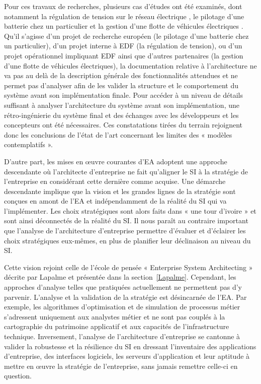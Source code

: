 	Pour ces travaux de recherches, plusieurs cas d'études ont été examinés, dont notamment la régulation de tension sur le réseau électrique \cite{seghiri2014simulation}, le pilotage d'une batterie chez un particulier \cite{seghiri2012animation} et la gestion d'une flotte de véhicules électriques \cite{seghiri2015simulation}. Qu'il s'agisse d'un projet de recherche européen (le pilotage d'une batterie chez un particulier), d'un projet interne à EDF (la régulation de tension), ou d'un projet opérationnel impliquant EDF ainsi que d'autres partenaires (la gestion d'une flotte de véhicules électriques), la documentation relative à l'architecture ne va pas au delà de la description générale des fonctionnalités attendues et ne permet pas d'analyser afin de les valider la structure et le comportement du système avant son implémentation finale. Pour accéder à un niveau de détails suffisant à analyser l'architecture du système avant son implémentation, une rétro-ingénierie du système final et des échanges avec les développeurs et les concepteurs ont été nécessaires. Ces constatations tirées du terrain rejoignent donc les conclusions de l'état de l'art concernant les limites des « modèles contemplatifs ».
	
	D'autre part, les mises en œuvre courantes d'EA adoptent une approche descendante où l'architecte d'entreprise ne fait qu'aligner le SI à la stratégie de l'entreprise en considérant cette dernière comme acquise. Une démarche descendante implique que la vision et les grandes lignes de la stratégie sont conçues en amont de l'EA et indépendamment de la réalité du SI qui va l'implémenter. Les choix stratégiques sont alors faits dans « une tour d'ivoire » et sont ainsi déconnectés de la réalité du SI. Il nous paraît au contraire important que l'analyse de l'architecture d'entreprise permettre d'évaluer et d'éclairer les choix stratégiques eux-mêmes, en plus de planifier leur déclinaison au niveau du SI. 
	
	Cette vision rejoint celle de l'école de pensée « Enterprise System Architecting » décrite par Lapalme \cite{lapalme2012three} et présentée dans la section~\ref{Lapalme}. Cependant, les approches d'analyse telles que pratiquées actuellement ne permettent pas d'y parvenir. L'analyse et la validation de la stratégie est désincarnée de l'EA. Par exemple, les algorithmes d'optimisation et de simulation de processus métier s'adressent uniquement aux analystes métier et ne sont pas couplés à la cartographie du patrimoine applicatif et aux capacités de l'infrastructure technique. Inversement, l'analyse de l'architecture d'entreprise se cantonne à valider la robustesse et la résilience du SI en dressant l'inventaire des applications d'entreprise, des interfaces logiciels, les serveurs d'application et leur aptitude à mettre en œuvre la stratégie de l'entreprise, sans jamais remettre celle-ci en question. 
	

